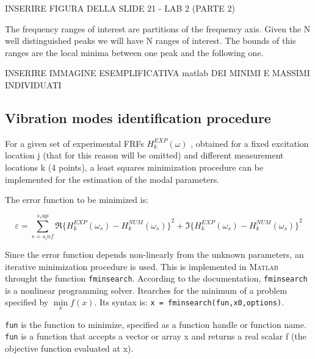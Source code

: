 \documentclass[a4paper,12pt,oneside]{article}
\begin{document}
INSERIRE FIGURA DELLA SLIDE 21 - LAB 2 (PARTE 2)

The frequency ranges of interest are partitions of the frequency axis. Given the N well distinguished peaks we will have N ranges of interest. The bounds of this ranges are the local minima between one peak and the following one. 

INSERIRE IMMAGINE ESEMPLIFICATIVA matlab DEI MINIMI E MASSIMI INDIVIDUATI
 
\subsection{Vibration modes identification procedure}
For a given set of experimental FRFs $H_k ^ {EXP} ( \omega) $ , obtained for a fixed excitation location j (that for this reason will be omitted) and different measurement locations k (4 points), a least squares minimization procedure can be implemented for the estimation of the modal parameters.

The error function to be minimized is:

\[
\varepsilon = \sum_{s=s_inf}^{s_sup} 
\Re{ \lbrace
H_k ^ {EXP} ( \omega_s) - H_k ^ {NUM} ( \omega_s)  
\rbrace }^2 +
\Im{ \lbrace
H_k ^ {EXP} ( \omega_s) - H_k ^ {NUM} ( \omega_s)  
\rbrace}^2
\]

Since the error function depends non-linearly from the unknown parameters, an iterative
minimization procedure is used. This is implemented in \textsc{Matlab} throught the function 
\texttt{fminsearch}. According to the documentation, \texttt{fminsearch} is a nonlinear programming solver. Itearches for the minimum of a problem specified by
$\min\limits_{x} f(x)$. 
Its syntax is: \texttt{x = fminsearch(fun,x0,options)}.

\texttt{fun} is the function to minimize, specified as a function handle or function name. \texttt{fun} is a function that accepts a vector or array x and returns a real scalar f (the objective function evaluated at x).
\end{document}
